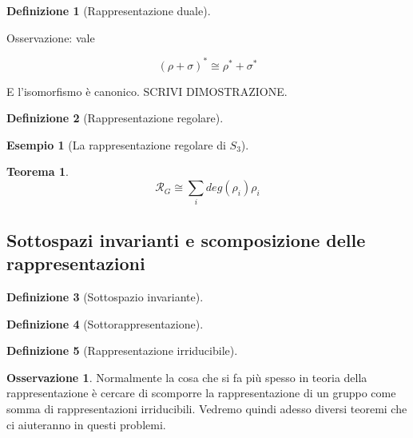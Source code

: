\documentclass[11pt]{article}
\theoremstyle{plain}
\newtheorem{thm}{Teorema}[section]
\theoremstyle{definition}
\newtheorem{defn}{Definizione}[section]
\newtheorem{exmp}{Esempio}[section]
\newtheorem*{rem}{Osservazione}
\theoremstyle{remark}
\newcommand{\dsum}{\displaystyle\sum}
\begin{document}
\begin{defn}[Rappresentazione duale]

\label{defn:rappresentazione duale}
\end{defn}

Osservazione: vale

\[ (\rho + \sigma)^* \cong \rho^* + \sigma^* \]

E l'isomorfismo è canonico. SCRIVI DIMOSTRAZIONE.





\begin{defn}[Rappresentazione regolare]

\label{defn:rappresentazione regolare}
\end{defn}

\begin{exmp}[La rappresentazione regolare di $S_3$]


\end{exmp}


\begin{thm}

\[\mathcal{R}_G \cong \dsum_i deg(\rho_i) \rho_i \]

\end{thm}



\subsection{Sottospazi invarianti e scomposizione delle rappresentazioni}


\begin{defn}[Sottospazio invariante]

\end{defn}

\begin{defn}[Sottorappresentazione]


\end{defn}



\begin{defn}[Rappresentazione irriducibile]

\end{defn}

\begin{rem} Normalmente la cosa che si fa più spesso in teoria della rappresentazione è cercare di scomporre la rappresentazione di un gruppo come somma di rappresentazioni irriducibili. Vedremo quindi adesso diversi teoremi che ci aiuteranno in questi problemi.

\end{rem}
\end{document}
